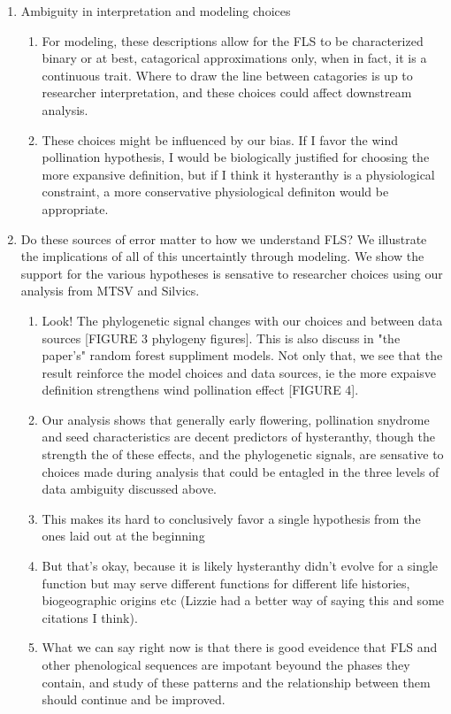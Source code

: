 \documentclass{article}\usepackage[]{graphicx}\usepackage[]{color}
\begin{document}
\begin{enumerate}
\begin{enumerate}
\end{enumerate}
\item Ambiguity in interpretation and modeling choices
\begin{enumerate}
\item For modeling, these descriptions allow for the FLS to be characterized binary or at best, catagorical approximations only, when in fact, it is a continuous trait. Where to draw the line between catagories is up to researcher interpretation, and these choices could affect downstream analysis.
\item These choices might be influenced by our bias. If I favor the wind pollination hypothesis, I would be biologically justified for choosing the more expansive definition, but if I think it hysteranthy is a physiological constraint, a more conservative physiological definiton would be appropriate.
\end{enumerate}
\item Do these sources of error matter to how we understand FLS? We illustrate the implications of all of this uncertaintly through modeling. We show the support for the various hypotheses is sensative to researcher choices using our analysis from MTSV and Silvics.
\begin{enumerate}
\item Look! The phylogenetic signal changes with our choices and between data sources  [FIGURE 3 phylogeny figures]. This is also discuss in "the paper's" random forest suppliment models. Not only that, we see that the result reinforce the model choices and data sources, ie the more expaisve definition strengthens wind pollination effect [FIGURE 4].
\item Our analysis shows that generally early flowering, pollination snydrome and seed characteristics are decent predictors of hysteranthy, though the strength the of these effects, and the phylogenetic signals, are sensative to choices made during analysis that could be entagled in the three levels of data ambiguity discussed above. 
\item This makes its hard to conclusively favor a single hypothesis from the ones laid out at the beginning
\item But that's okay, because it is likely hysteranthy didn't evolve for a single function but may serve different functions for different life histories, biogeographic origins etc (Lizzie had a better way of saying this and some citations I think).
\item What we can say right now is that there is good eveidence that FLS and other phenological sequences are impotant beyound the phases they contain, and study of these patterns and the relationship between them should continue and be improved.

\end{enumerate}
\end{enumerate}
\end{document}
